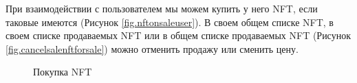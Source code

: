 При взаимодействии с пользователем мы можем купить у него NFT, если таковые имеются (Рисунок {\color{blue} \ref{fig.nftonsaleuser}}). В своем общем списке NFT, в своем списке продаваемых NFT или в общем списке продаваемых NFT (Рисунок {\color{blue} \ref{fig.cancelsalenftforsale}}) можно отменить продажу или сменить цену.

\begin{figure}
    \centering
    \caption{Покупка NFT}
\end{figure}

